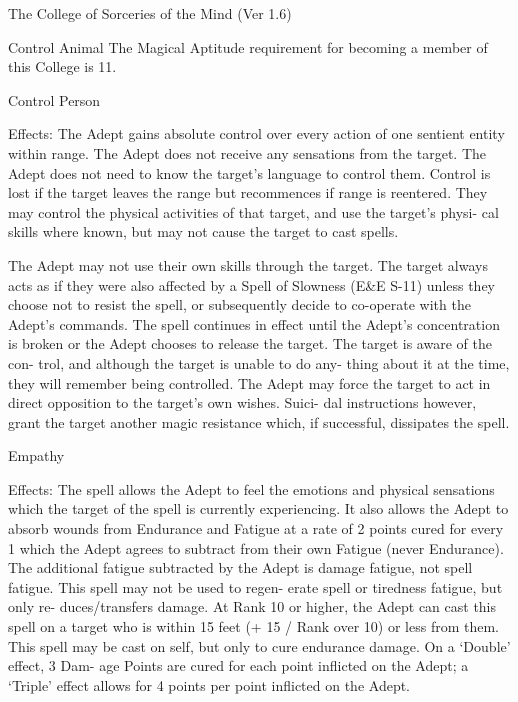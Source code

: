 \begin{Chapter}{The College of Sorceries of the Mind (Ver 1.6)}
\begin{spell}[G-1]{Control Animal }
The Magical Aptitude requirement for becoming a 
member of this College is 11. 

\end{spell}

\begin{spell}[G-2]{Control Person }

Effects:  The  Adept  gains  absolute  control  over 
every  action  of  one  sentient  entity  within  range. 
The  Adept  does  not  receive  any  sensations  from 
the  target.  The  Adept  does  not  need  to  know  the 
target’s language to control them. Control is lost if 
the  target  leaves  the  range  but  recommences  if 
range  is  reentered.  They  may  control  the  physical 
activities  of  that target, and use the target’s  physi-
cal  skills  where  known,  but  may  not  cause  the 
target to cast spells. 

The Adept may not use their own skills through the 
target.  The  target  always  acts  as  if  they  were  also 
affected by a Spell of Slowness (E\&E S-11) unless 
they choose not to resist the spell, or subsequently 
decide  to  co-operate  with  the  Adept’s  commands. 
The  spell  continues  in  effect  until  the  Adept’s 
concentration  is  broken  or  the  Adept  chooses  to 
release  the  target.  The  target  is  aware  of  the  con-
trol,  and  although  the  target  is  unable  to  do  any-
thing about it at the time, they will remember being 
controlled. The Adept may force the target to act in 
direct opposition to the target’s own wishes. Suici-
dal  instructions  however,  grant  the  target  another 
magic resistance which, if successful, dissipates the 
spell. 

\end{spell}

\begin{spell}[G-3]{Empathy }

Effects:  The  spell  allows  the  Adept  to  feel  the 
emotions  and  physical  sensations  which  the  target 
of the spell is currently experiencing. It also allows 
the  Adept  to  absorb  wounds  from  Endurance  and 
Fatigue  at  a  rate  of  2  points  cured  for  every  1 
which the Adept agrees to subtract from their own 
Fatigue  (never  Endurance).  The  additional  fatigue 
subtracted  by  the  Adept  is  damage  fatigue,  not 
spell fatigue. This spell may not be used to regen-
erate  spell  or  tiredness  fatigue,  but  only  re-
duces/transfers damage. At Rank 10 or higher, the 
Adept can cast this spell on a target who is within 
15  feet  (+  15  /  Rank  over  10)  or  less  from  them. 
This  spell  may  be  cast  on  self,  but  only  to  cure 
endurance  damage.  On  a  ‘Double’  effect,  3  Dam-
age Points are cured for each point inflicted on the 
Adept;  a  ‘Triple’  effect  allows  for  4  points  per 
point inflicted on the Adept. 


\end{spell}
\end{Chapter}
